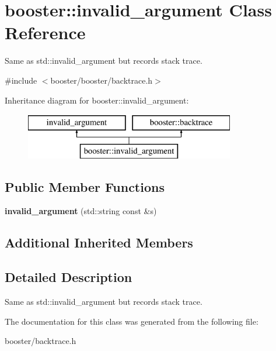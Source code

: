 \section{booster\-:\-:invalid\-\_\-argument Class Reference}
\label{classbooster_1_1invalid__argument}


Same as std\-::invalid\-\_\-argument but records stack trace.  




{\ttfamily \#include $<$booster/booster/backtrace.\-h$>$}

Inheritance diagram for booster\-:\-:invalid\-\_\-argument\-:\begin{figure}[H]
\begin{center}
\leavevmode
\includegraphics[height=2.000000cm]{classbooster_1_1invalid__argument}
\end{center}
\end{figure}
\subsection*{Public Member Functions}
\begin{DoxyCompactItemize}
\item 
{\bfseries invalid\-\_\-argument} (std\-::string const \&s)\label{classbooster_1_1invalid__argument_a51dd0443006b5636515ff1e38dccc6a6}

\end{DoxyCompactItemize}
\subsection*{Additional Inherited Members}


\subsection{Detailed Description}
Same as std\-::invalid\-\_\-argument but records stack trace. 

The documentation for this class was generated from the following file\-:\begin{DoxyCompactItemize}
\item 
booster/backtrace.\-h\end{DoxyCompactItemize}
